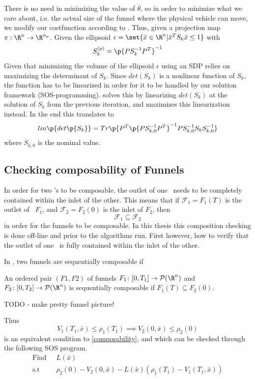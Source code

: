 There is no need in minimizing the value of \(\dot{\theta}\), so in order to
minimize what we care about, i.e. the actual size of the funnel where the
physical vehicle can move, we modify our costfunction according to
\cite{majumdarFunnelLibrariesRealtime2017}. Thus, given a projection map \(\pi :
\R^n \rightarrow \R^{n_p}\). Given the ellipsoid \(\epsilon = \set{\bar{x} \in
  \R^n | \bar{x}^TS_{k}\bar{x} \leq 1}\) with
\[
  S_k^{(p)} = \p{PS_k^{-1}P^T}^{-1}
\]
Given that minimizing the volume of the ellipsoid \(\epsilon\) using an SDP
relies on maximizing the determinant of \(S_k\). Since \(det(S_k)\) is a
nonlinear function of \(S_k\), the function has to be linearized in order for it
to be handled by our solution framework (SOS-programming).
\cite{majumdarFunnelLibrariesRealtime2017} solves this by linearizing
\(det(S_k)\) at the solution of \(S_k\) from the previous iteration, and
maximizes this linearization instead. In the end this translates to
\[
  lin\p{det\p{S_k}} =
  Tr\p{P^T\p{PS_{k,0}^{-1}P^T}^{-1}PS_{k,0}^{-1}S_kS_{k,0}^{-1}}
\]
where \(S_{k,0}\) is the nominal value.

\subsection{Checking composability of Funnels}

In order for two \funnel's to be composable, the outlet of one \funnel\ needs to
be completely contained within the inlet of the other. This means that if
\(\mathcal{F}_1 = F_1(T)\) is the outlet of \funnel\ \(F_1\), and
\(\mathcal{F}_2 = F_2(0)\) is the inlet of \(F_2\), then
\[
  \mathcal{F}_1 \subseteq \mathcal{F}_2
\]
\label{composability}
in order for the funnels to be composable. In this thesis this composition
checking is done off-line and prior to the algorithms run. First however, how to
verify that the outlet of one \funnel\ is fully contained within the inlet of
the other.

In \cite[Majumdar and Tedrake, p.~47]{majumdarFunnelLibrariesRealtime2017}, two
funnels are sequentially composable if
\begin{definition}
  An ordered pair \((F1, F2)\) of funnels \(F_1 \colon [0,T_1] \rightarrow
  \mathcal{P}(\R^n)\) and \(F_2 \colon [0,T_2] \rightarrow \mathcal{P}(\R^n)\)
  is sequentially composable if \(F_1(T) \subseteq F_2(0)\).
\end{definition}

TODO - make pretty funnel picture!

Thus
\[
  V_1(T_1,\bar{x}) \leq \rho_1(T_1) \implies V_2(0,\bar{x}) \leq \rho_2(0)
\]
is an equivalent condition to \ref{composability}, and which can be checked
through the following \ac{SOS} program.
\begin{align*}
  \text{Find } \; &L(\bar{x}) \\
  \text{s.t} \; &\rho_2(0) - V_2(0,\bar{x}) - L(\bar{x})
                  \left( \rho_1(T_1) - V_1(T_1,\bar{x}) \right)
\end{align*}
\cite[Majumdar and Tedrake, p.~54]{majumdarFunnelLibrariesRealtime2017}

